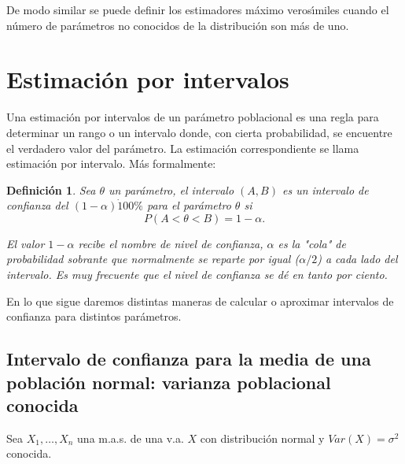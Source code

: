 \documentclass[12pt]{report}
\newtheorem{definition}{Definici\'on}
\begin{document}
De modo similar se puede definir los estimadores m\'aximo veros\'{\i}miles cuando el n\'umero de
par\'ametros no conocidos de la distribuci\'on son m\'as de uno.

  \section{Estimaci\'on por intervalos}


  Una estimaci\'on por intervalos de un par\'ametro poblacional es una
  regla para determinar un rango o un intervalo donde, con cierta
  probabilidad, se encuentre el verdadero valor del par\'ametro.
  La estimaci\'on correspondiente se llama estimaci\'on por intervalo. M\'as formalmente:

%
%
%
%

      \begin{definition}
Sea $\theta$ un par\'ametro, el intervalo $\left(A,B\right)$ es un intervalo de confianza del
$(1-\alpha)\dot 100\% $ para el par\'ametro $\theta$ si $$P(A<\theta<B)=1-\alpha.$$


El valor $1-\alpha$ recibe el nombre de nivel de confianza, $\alpha$ es la "\emph{cola}" de
probabilidad sobrante que normalmente se reparte por igual ($\alpha/2$) a cada lado del
intervalo.
 Es muy frecuente que el nivel de confianza se d\'e en tanto por ciento.
\end{definition}

En lo que sigue daremos distintas maneras de calcular o aproximar intervalos de confianza
para distintos par\'ametros.

    \subsection{Intervalo de confianza para la media de una poblaci\'on
    normal: varianza poblacional conocida}

    Sea $X_{1},\ldots,X_{n}$ una m.a.s. de una v.a. $X$ con distribuci\'on
    normal y $Var(X)=\sigma^2$ conocida.
\end{document}
